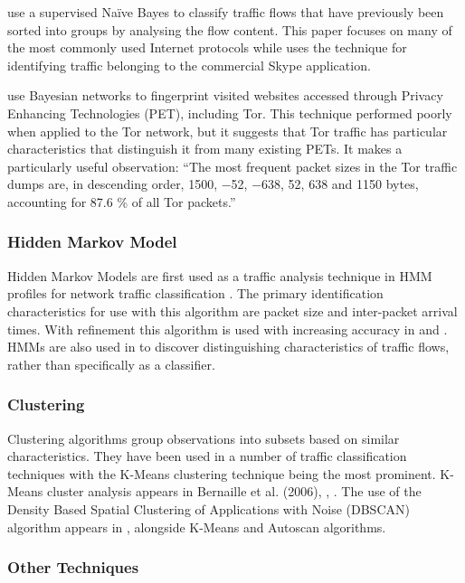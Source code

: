 \documentclass{ecuthesis}
\begin{document}
\cite{Moore:2005p3827} use a supervised Naïve Bayes to classify traffic flows that have previously been sorted into groups by analysing the flow content. This paper focuses on many of the most commonly used Internet protocols while \cite{Bonfiglio:2007p6453} uses the technique for identifying traffic belonging to the commercial Skype application.

\cite{Herrmann:2009p1189} use Bayesian networks to fingerprint visited websites accessed through Privacy Enhancing Technologies (PET), including Tor. This technique performed poorly when applied to the Tor network, but it suggests that Tor traffic has particular characteristics that distinguish it from many existing PETs. It makes a particularly useful observation: “The most frequent packet sizes in the Tor traffic dumps are, in descending order, 1500, −52, −638, 52, 638 and 1150 bytes, accounting for 87.6 \% of all Tor packets.”

\subsubsection{Hidden Markov Model}

Hidden Markov Models are first used as a traffic analysis technique in HMM profiles for network traffic classification \citep{Wright:2004p3860}. The primary identification characteristics for use with this algorithm are packet size and inter-packet arrival times. With refinement this algorithm is used with increasing accuracy in \cite{Wright:2006p322} and \cite{Dainotti:2008p1435}. HMMs are also used in \cite{Bernaille:2005p6205} to discover distinguishing characteristics of traffic flows, rather than specifically as a classifier.

\subsubsection{Clustering}

Clustering algorithms group observations into subsets based on similar characteristics. They have been used in a number of traffic classification techniques with the K-Means clustering technique being the most prominent. K-Means cluster analysis appears in Bernaille et al. (2006), \cite{Erman:2007p3764}, \cite{Erman:2007p6206}. The use of the Density Based Spatial Clustering of Applications with Noise (DBSCAN) algorithm appears in \cite{Erman:2006p3766}, alongside K-Means and Autoscan algorithms.

\subsubsection{Other Techniques}
\end{document}
